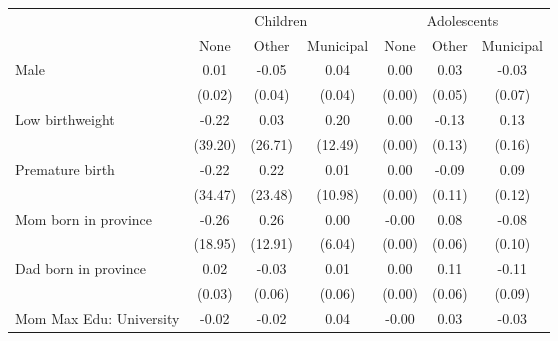 {
\def\sym#1{\ifmmode^{#1}\else\(^{#1}\)\fi}
\begin{tabular}{l*{6}{c}}
\toprule
&\multicolumn{3}{c}{Children} & \multicolumn{3}{c}{Adolescents} \\
                    &\multicolumn{1}{c}{None}&\multicolumn{1}{c}{Other}&\multicolumn{1}{c}{Municipal}&\multicolumn{1}{c}{None}&\multicolumn{1}{c}{Other}&\multicolumn{1}{c}{Municipal}\\
\midrule
Male                &        0.01         &       -0.05         &        0.04         &        0.00         &        0.03         &       -0.03         \\
                    &      (0.02)         &      (0.04)         &      (0.04)         &      (0.00)         &      (0.05)         &      (0.07)         \\
\addlinespace
Low birthweight     &       -0.22         &        0.03         &        0.20         &        0.00         &       -0.13         &        0.13         \\
                    &     (39.20)         &     (26.71)         &     (12.49)         &      (0.00)         &      (0.13)         &      (0.16)         \\
\addlinespace
Premature birth     &       -0.22         &        0.22         &        0.01         &        0.00         &       -0.09         &        0.09         \\
                    &     (34.47)         &     (23.48)         &     (10.98)         &      (0.00)         &      (0.11)         &      (0.12)         \\
\addlinespace
Mom born in province&       -0.26         &        0.26         &        0.00         &       -0.00         &        0.08         &       -0.08         \\
                    &     (18.95)         &     (12.91)         &      (6.04)         &      (0.00)         &      (0.06)         &      (0.10)         \\
\addlinespace
Dad born in province&        0.02         &       -0.03         &        0.01         &        0.00         &        0.11         &       -0.11         \\
                    &      (0.03)         &      (0.06)         &      (0.06)         &      (0.00)         &      (0.06)         &      (0.09)         \\
\addlinespace
Mom Max Edu: University&       -0.02         &       -0.02         &        0.04         &       -0.00         &        0.03         &       -0.03         \\

\end{tabular}}
